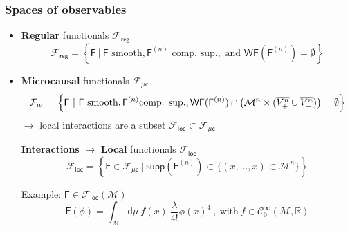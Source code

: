 \documentclass[9pt]{beamer}
\newcommand{\WF}{\mathsf{WF}} %
\newcommand{\supp}{\mathsf{supp}} %
\newcommand{\Ccal}{\mathcal{C}}
\newcommand{\Fcal}{\mathcal{F}}
\newcommand{\Mcal}{\mathcal{M}}
\newcommand{\Rbb}{\mathbb{R}}
\newcommand{\Fsf}{\mathsf{F}}
\newcommand{\csf}{\mathsf{c}}
\newcommand{\dsf}{\mathsf{d}}
\begin{document}
\begin{frame}

\frametitle{Spaces of observables}

\begin{itemize}
  
\item \textbf{Regular} functionals $\Fcal_{\mathsf{reg}}$ \\[-12pt]   
\begin{equation*}
\Fcal_{\mathsf{reg}} = \left\{ \Fsf \ | \ \Fsf \mbox{ smooth}, \Fsf^{(n)} \mbox{ comp. sup.}, \mbox{ and } \WF(\Fsf^{(n)}) = \emptyset \right\} 
\end{equation*}
    
\item \textbf{Microcausal} functionals $\Fcal_{\mu\csf}$ \\[-24pt]    
\begin{equation*}
\Fcal_{\mu\csf} = \left\{ \Fsf \ | \ \Fsf \mbox{ smooth}, \Fsf^{(n)} \mbox{comp. sup.}, \WF(\Fsf^{(n)}) \cap \left( \Mcal^n \times ( \overline{V^{n}_{+}} \cup \overline{V^{n}_{-}} ) \right)  = \emptyset \right\} 
\vspace*{-8pt}
\end{equation*}
\hspace*{15pt} $\to$ local interactions are a subset $\Fcal_{\mathsf{loc}} \subset \Fcal_{\mu\csf}$ 
  
\vspace*{14pt}
  
\hspace*{2pt}%
\textbf{Interactions} $\to$ \textbf{Local} functionals $\Fcal_{\mathsf{loc}}$ \\[-12pt]
\begin{equation*}
\Fcal_{\mathsf{loc}} = \left\{ \Fsf \in \Fcal_{\mu\csf} \ | \ \supp(\Fsf^{(n)}) \subset \{ (x,\dots,x) \subset \Mcal^n \} \right\}
\end{equation*}

\hspace*{2pt}%
Example: $\Fsf \in \Fcal_\mathsf{loc}(\Mcal)$
\vspace*{-2pt}
\begin{equation*}
\Fsf(\phi) = \int_\Mcal \dsf\mu \ f(x) \ \frac{\lambda}{4!} \phi(x)^4 \ , \ \mbox{with} \ f \in \Ccal^\infty_0(\Mcal,\Rbb)
\end{equation*}

\end{itemize}

\end{frame}  
\end{document}
